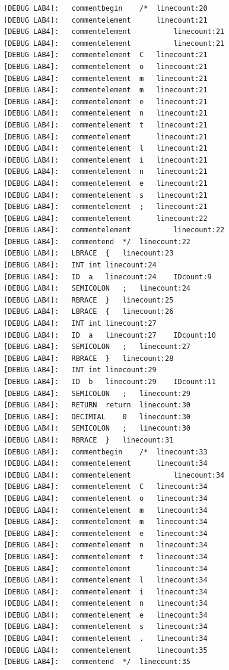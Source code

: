 \documentclass[UTF8,a4paper,10pt]{ctexart}
\begin{document}
\begin{lstlisting}[title = 词法分析结果]
[DEBUG LAB4]: 	commentbegin	/*	linecount:20
[DEBUG LAB4]: 	commentelement		linecount:21
[DEBUG LAB4]: 	commentelement			linecount:21
[DEBUG LAB4]: 	commentelement			linecount:21
[DEBUG LAB4]: 	commentelement	C	linecount:21
[DEBUG LAB4]: 	commentelement	o	linecount:21
[DEBUG LAB4]: 	commentelement	m	linecount:21
[DEBUG LAB4]: 	commentelement	m	linecount:21
[DEBUG LAB4]: 	commentelement	e	linecount:21
[DEBUG LAB4]: 	commentelement	n	linecount:21
[DEBUG LAB4]: 	commentelement	t	linecount:21
[DEBUG LAB4]: 	commentelement	 	linecount:21
[DEBUG LAB4]: 	commentelement	l	linecount:21
[DEBUG LAB4]: 	commentelement	i	linecount:21
[DEBUG LAB4]: 	commentelement	n	linecount:21
[DEBUG LAB4]: 	commentelement	e	linecount:21
[DEBUG LAB4]: 	commentelement	s	linecount:21
[DEBUG LAB4]: 	commentelement	;	linecount:21
[DEBUG LAB4]: 	commentelement		linecount:22
[DEBUG LAB4]: 	commentelement			linecount:22
[DEBUG LAB4]: 	commentend	*/	linecount:22
[DEBUG LAB4]: 	LBRACE	{	linecount:23
[DEBUG LAB4]: 	INT	int	linecount:24
[DEBUG LAB4]: 	ID	a	linecount:24	IDcount:9
[DEBUG LAB4]: 	SEMICOLON	;	linecount:24
[DEBUG LAB4]: 	RBRACE	}	linecount:25
[DEBUG LAB4]: 	LBRACE	{	linecount:26
[DEBUG LAB4]: 	INT	int	linecount:27
[DEBUG LAB4]: 	ID	a	linecount:27	IDcount:10
[DEBUG LAB4]: 	SEMICOLON	;	linecount:27
[DEBUG LAB4]: 	RBRACE	}	linecount:28
[DEBUG LAB4]: 	INT	int	linecount:29
[DEBUG LAB4]: 	ID	b	linecount:29	IDcount:11
[DEBUG LAB4]: 	SEMICOLON	;	linecount:29
[DEBUG LAB4]: 	RETURN	return	linecount:30
[DEBUG LAB4]: 	DECIMIAL	0	linecount:30
[DEBUG LAB4]: 	SEMICOLON	;	linecount:30
[DEBUG LAB4]: 	RBRACE	}	linecount:31
[DEBUG LAB4]: 	commentbegin	/*	linecount:33
[DEBUG LAB4]: 	commentelement		linecount:34
[DEBUG LAB4]: 	commentelement			linecount:34
[DEBUG LAB4]: 	commentelement	C	linecount:34
[DEBUG LAB4]: 	commentelement	o	linecount:34
[DEBUG LAB4]: 	commentelement	m	linecount:34
[DEBUG LAB4]: 	commentelement	m	linecount:34
[DEBUG LAB4]: 	commentelement	e	linecount:34
[DEBUG LAB4]: 	commentelement	n	linecount:34
[DEBUG LAB4]: 	commentelement	t	linecount:34
[DEBUG LAB4]: 	commentelement	 	linecount:34
[DEBUG LAB4]: 	commentelement	l	linecount:34
[DEBUG LAB4]: 	commentelement	i	linecount:34
[DEBUG LAB4]: 	commentelement	n	linecount:34
[DEBUG LAB4]: 	commentelement	e	linecount:34
[DEBUG LAB4]: 	commentelement	s	linecount:34
[DEBUG LAB4]: 	commentelement	.	linecount:34
[DEBUG LAB4]: 	commentelement		linecount:35
[DEBUG LAB4]: 	commentend	*/	linecount:35
\end{lstlisting}


\end{document}

